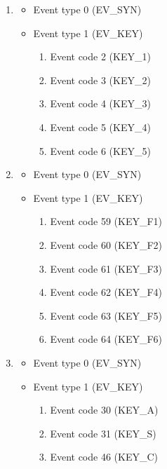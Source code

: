 \documentclass[UTF8]{ctexart}
\begin{document}
\begin{enumerate}
    \item {} 
        \begin{itemize}
            \item Event type 0 (EV\_SYN)
            \item Event type 1 (EV\_KEY)
                \begin{enumerate}[label=\arabic*.]
                    \item Event code 2 (KEY\_1)
                    \item Event code 3 (KEY\_2)
                    \item Event code 4 (KEY\_3)
                    \item Event code 5 (KEY\_4)
                    \item Event code 6 (KEY\_5)
                \end{enumerate}
        \end{itemize}

    \item {} 
        \begin{itemize}
            \item Event type 0 (EV\_SYN)
            \item Event type 1 (EV\_KEY)
                \begin{enumerate}[label=\arabic*.]
                    \item Event code 59 (KEY\_F1)
                    \item Event code 60 (KEY\_F2)
                    \item Event code 61 (KEY\_F3)
                    \item Event code 62 (KEY\_F4)
                    \item Event code 63 (KEY\_F5)
                    \item Event code 64 (KEY\_F6)
                \end{enumerate}
        \end{itemize}

    \item {} 
        \begin{itemize}
            \item Event type 0 (EV\_SYN)
            \item Event type 1 (EV\_KEY)
                \begin{enumerate}[label=\arabic*.]
                    \item Event code 30 (KEY\_A)
                    \item Event code 31 (KEY\_S)
                    \item Event code 46 (KEY\_C)
                \end{enumerate}
        \end{itemize}
\end{enumerate}
\end{document}
